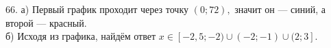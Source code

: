 66. а) Первый график проходит через точку $(0;72),$ значит он --- синий, а второй --- красный.\\
б) Исходя из графика, найдём ответ $x\in[-2,5;-2)\cup(-2;-1)\cup(2;3].$\\
